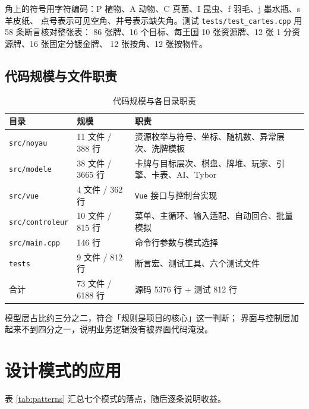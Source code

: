 \documentclass[11pt,a4paper]{ctexart}
\newcommand{\cl}[1]{\texttt{#1}}
\begin{document}
角上的符号用字符编码：P 植物、A 动物、C 真菌、I 昆虫、f 羽毛、j 墨水瓶、s 羊皮纸、
点号表示可见空角、井号表示缺失角。测试 \cl{tests/test\_cartes.cpp} 用 58 条断言核对整张表：
86 张牌、16 个目标、每王国 10 张资源牌、12 张 1 分资源牌、16 张固定分镀金牌、
12 张按角、12 张按物件。

\subsection{代码规模与文件职责}
\begin{table}[h]
\centering
\small
\begin{tabular}{p{2.8cm}p{3.0cm}p{8.2cm}}
\toprule
目录 & 规模 & 职责 \\
\midrule
\cl{src/noyau} & 11 文件 / 388 行 & 资源枚举与符号、坐标、随机数、异常层次、洗牌模板 \\
\cl{src/modele} & 38 文件 / 3665 行 & 卡牌与目标层次、棋盘、牌堆、玩家、引擎、卡表、AI、Tybor \\
\cl{src/vue} & 4 文件 / 362 行 & \cl{Vue} 接口与控制台实现 \\
\cl{src/controleur} & 10 文件 / 815 行 & 菜单、主循环、输入适配、自动回合、批量模拟 \\
\cl{src/main.cpp} & 146 行 & 命令行参数与模式选择 \\
\cl{tests} & 9 文件 / 812 行 & 断言宏、测试工具、六个测试文件 \\
\midrule
合计 & 73 文件 / 6188 行 & 源码 5376 行 + 测试 812 行 \\
\bottomrule
\end{tabular}
\caption{代码规模与各目录职责}
\label{tab:taille}
\end{table}
模型层占比约三分之二，符合「规则是项目的核心」这一判断；
界面与控制层加起来不到四分之一，说明业务逻辑没有被界面代码淹没。

\section{设计模式的应用}
表 \ref{tab:patterns} 汇总七个模式的落点，随后逐条说明收益。
\end{document}
